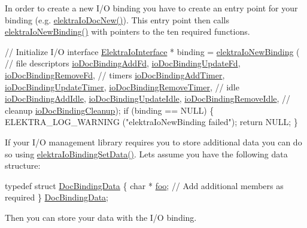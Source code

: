 In order to create a new I/O binding you have to create an entry point for your binding (e.\+g. \hyperlink{io__doc_8c_af4bd586146acfbb1c1324483b79f0cc3}{elektra\+Io\+Doc\+New()}). This entry point then calls \hyperlink{io_8c_a8dd14e7bd04afb798ea30ff8feb5f3a6}{elektra\+Io\+New\+Binding()} with pointers to the ten required functions.


\begin{DoxyCodeInclude}
        \textcolor{comment}{// Initialize I/O interface}
        \hyperlink{kdbio_8h_aabcd87b8c09d4d4c1033fc1baa417391}{ElektraIoInterface} * binding = \hyperlink{io_8c_a8dd14e7bd04afb798ea30ff8feb5f3a6}{elektraIoNewBinding} (
                \textcolor{comment}{// file descriptors}
                \hyperlink{io__doc_8c_ae9b5f4e891829f3af8563e8160e1bd02}{ioDocBindingAddFd}, \hyperlink{io__doc_8c_a172a781f21310745a16cb24c578c4656}{ioDocBindingUpdateFd}, 
      \hyperlink{io__doc_8c_ac5a985c3d54b2c06838d8af1719fcf09}{ioDocBindingRemoveFd},
                \textcolor{comment}{// timers}
                \hyperlink{io__doc_8c_a4392a7bfa23513cf4cff7bcf4b0c4c68}{ioDocBindingAddTimer}, 
      \hyperlink{io__doc_8c_a1ed16f0e61d2c7c59735b321b7080dec}{ioDocBindingUpdateTimer}, \hyperlink{io__doc_8c_afc27d1f174e30aab500a9e94a366f8ec}{ioDocBindingRemoveTimer},
                \textcolor{comment}{// idle}
                \hyperlink{io__doc_8c_ae7db8c833350176d2570cc4a010c2692}{ioDocBindingAddIdle}, \hyperlink{io__doc_8c_a9b8faf0861123676a0a826987962552f}{ioDocBindingUpdateIdle}, 
      \hyperlink{io__doc_8c_ad813afce995620df6542c3cdd32b23e6}{ioDocBindingRemoveIdle},
                \textcolor{comment}{// cleanup}
                \hyperlink{io__doc_8c_a8bfb50f3c81b02ba9f0ad1a2f24afb6d}{ioDocBindingCleanup});
        \textcolor{keywordflow}{if} (binding == NULL)
        \{
                ELEKTRA\_LOG\_WARNING (\textcolor{stringliteral}{"elektraIoNewBinding failed"});
                \textcolor{keywordflow}{return} NULL;
        \}
\end{DoxyCodeInclude}
 If your I/O management library requires you to store additional data you can do so using \hyperlink{io_8c_a6021718783b36ca71bb465bc08a682cc}{elektra\+Io\+Binding\+Set\+Data()}. Let\textquotesingle{}s assume you have the following data structure\+:


\begin{DoxyCodeInclude}

\textcolor{keyword}{typedef} \textcolor{keyword}{struct }\hyperlink{structDocBindingData}{DocBindingData}
\{
        \textcolor{keywordtype}{char} * \hyperlink{structDocBindingData_ad3a3b6278b9d7287f923de0e6c3fa14d}{foo};
        \textcolor{comment}{// Add additional members as required}
\} \hyperlink{io__doc_8c_a00328aad71b73010cecf82f878a09a9a}{DocBindingData};
\end{DoxyCodeInclude}
 Then you can store your data with the I/O binding.



